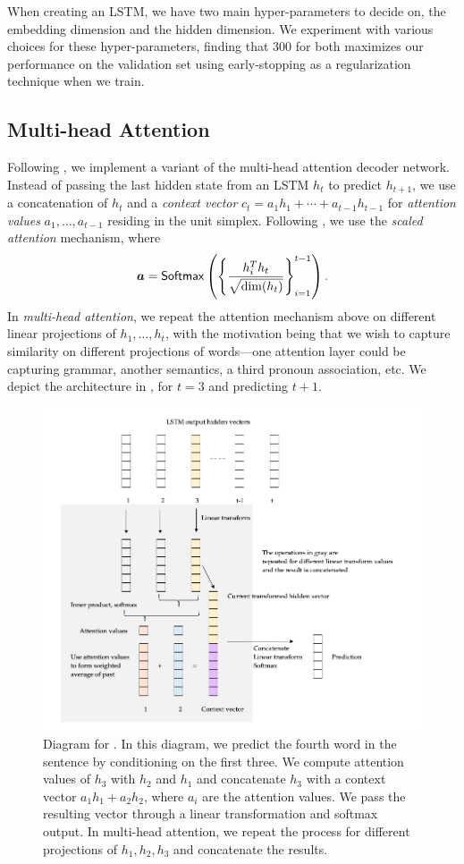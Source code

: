 \documentclass[12pt]{article}
\begin{document}
When creating an LSTM, we have two main hyper-parameters to decide on, the
embedding dimension and the hidden dimension. We experiment with various choices
for these hyper-parameters, finding that 300 for both maximizes our performance
on the validation set using early-stopping as a regularization technique when we
train.

\subsection{Multi-head Attention}
\label{sub:attn}

Following \cite{vaswani2017attention}, we implement a variant of the multi-head
attention
decoder network. Instead of passing the last hidden state from an LSTM $h_t$ to
predict $h_{t+1}$, we use a concatenation of $h_t$ and a \emph{context vector}
$c_t = a_1 h_1 + \cdots + a_{t-1} h_{t-1}$ for \emph{attention values}
$a_1,\ldots, a_{t-1}$ residing in the unit simplex. Following
\cite{vaswani2017attention}, we use the \emph{scaled attention} mechanism,
where \[
\bm a = \mathsf{Softmax}\left({\left\{{\frac{h_i^T h_t}{\sqrt{\dim(h_t)}}}\right\}_{i=1}^{t-1}}\right).
\]
In \emph{multi-head attention}, we repeat the attention mechanism above on
different linear projections of $h_1,\ldots,h_t$, with the motivation being that
we wish to capture similarity on different projections of words---one attention
layer could be capturing grammar, another semantics, a third pronoun
association, etc. We depict the architecture in , for $t=3$ and
predicting $t+1$.
\begin{figure}[tb]
    \centering
    \includegraphics[width=\textwidth]{figs/attention.png}
    \caption{Diagram for . In this diagram, we predict the
    fourth word in the sentence by conditioning on the first three. We compute
    attention values of $h_3$ with $h_2$ and $h_1$ and concatenate $h_3$ with a
    context vector $a_1 h_1 + a_2 h_2$, where $a_i$ are the attention values.
    We pass the resulting vector through a linear transformation and softmax
    output. In multi-head attention, we repeat the process for different
    projections of $h_1,h_2,h_3$ and concatenate the results.}
    \label{fig:attn}
\end{figure}
\end{document}
